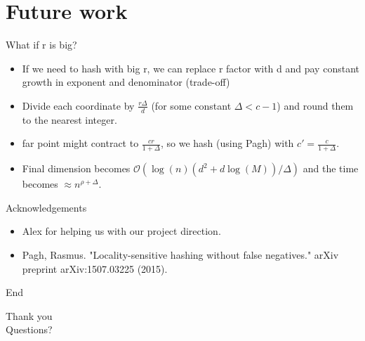 \documentclass[xcolor=svgnames]{beamer}
\newcommand{\BO}{{\mathcal{O}}}
\begin{document}
\section{Future work}

\begin{frame}{What if r is big?}
\begin{itemize}
\item If we need to hash with big r, we can replace r factor with d and pay constant growth in exponent and denominator (trade-off)
\item Divide each coordinate by $\tfrac{r\Delta}{d}$ (for some constant $\Delta < c - 1$) and round them to the nearest integer.
\item far point might contract to $\tfrac{cr}{1+\Delta}$, so we hash (using Pagh) with $c'=\tfrac{c}{1+\Delta}$.
\item Final dimension becomes $\BO(\log(n) (d^2 + d \log(M))/\Delta)$ and the time becomes $\approx n^{\rho + \Delta}$.
\end{itemize}
\end{frame}

\begin{frame}{Acknowledgements}
\begin{itemize}
    \item Alex for helping us with our project direction.
    \item Pagh, Rasmus. "Locality-sensitive hashing without false negatives." arXiv preprint arXiv:1507.03225 (2015).
\end{itemize}
\end{frame}

\begin{frame}{End}
\begin{center}
\huge{Thank you}
\\
\vspace{10mm}
\Large{Questions?}
\end{center}
\end{frame}
\end{document}
